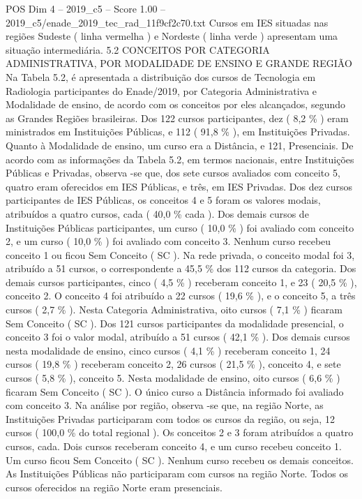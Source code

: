 \begin{textsample}{POS Dim 4 – 2019\_c5 – Score 1.00 – 2019\_c5/enade\_2019\_tec\_rad\_11f9cf2c70.txt}
Cursos em IES situadas nas regiões Sudeste ( linha vermelha ) e Nordeste ( linha verde ) apresentam uma situação intermediária. 5.2 CONCEITOS POR CATEGORIA ADMINISTRATIVA, POR MODALIDADE DE ENSINO E GRANDE REGIÃO Na Tabela 5.2, é apresentada a distribuição dos cursos de Tecnologia em Radiologia participantes do Enade/2019, por Categoria Administrativa e Modalidade de ensino, de acordo com os conceitos por eles alcançados, segundo as Grandes Regiões brasileiras.
Dos 122 cursos participantes, dez ( 8,2 \% ) eram ministrados em Instituições Públicas, e 112 ( 91,8 \% ), em Instituições Privadas.
Quanto à Modalidade de ensino, um curso era a Distância, e 121, Presenciais.
De acordo com as informações da Tabela 5.2, em termos nacionais, entre Instituições Públicas e Privadas, observa -se que, dos sete cursos avaliados com conceito 5, quatro eram oferecidos em IES Públicas, e três, em IES Privadas.
Dos dez cursos participantes de IES Públicas, os conceitos 4 e 5 foram os valores modais, atribuídos a quatro cursos, cada ( 40,0 \% cada ).
Dos demais cursos de Instituições Públicas participantes, um curso ( 10,0 \% ) foi avaliado com conceito 2, e um curso ( 10,0 \% ) foi avaliado com conceito 3.
Nenhum curso recebeu conceito 1 ou ficou Sem Conceito ( SC ).
Na rede privada, o conceito modal foi 3, atribuído a 51 cursos, o correspondente a 45,5 \% dos 112 cursos da categoria.
Dos demais cursos participantes, cinco ( 4,5 \% ) receberam conceito 1, e 23 ( 20,5 \% ), conceito 2.
O conceito 4 foi atribuído a 22 cursos ( 19,6 \% ), e o conceito 5, a três cursos ( 2,7 \% ).
Nesta Categoria Administrativa, oito cursos ( 7,1 \% ) ficaram Sem Conceito ( SC ).
Dos 121 cursos participantes da modalidade presencial, o conceito 3 foi o valor modal, atribuído a 51 cursos ( 42,1 \% ).
Dos demais cursos nesta modalidade de ensino, cinco cursos ( 4,1 \% ) receberam conceito 1, 24 cursos ( 19,8 \% ) receberam conceito 2, 26 cursos ( 21,5 \% ), conceito 4, e sete cursos ( 5,8 \% ), conceito 5.
Nesta modalidade de ensino, oito cursos ( 6,6 \% ) ficaram Sem Conceito ( SC ).
O único curso a Distância informado foi avaliado com conceito 3.
Na análise por região, observa -se que, na região Norte, as Instituições Privadas participaram com todos os cursos da região, ou seja, 12 cursos ( 100,0 \% do total regional ).
Os conceitos 2 e 3 foram atribuídos a quatro cursos, cada.
Dois cursos receberam conceito 4, e um curso recebeu conceito 1.
Um curso ficou Sem Conceito ( SC ).
Nenhum curso recebeu os demais conceitos.
As Instituições Públicas não participaram com cursos na região Norte.
Todos os cursos oferecidos na região Norte eram presenciais.

\end{textsample}
